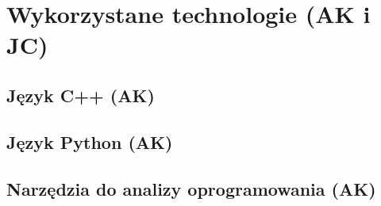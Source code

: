 \chapter{Wykorzystane technologie (AK i JC)}
\label{ch:technologies}

\graphicspath{{2_technologies/static/}}



\section{Język C++ (AK)}


\section{Język Python (AK)}

\section{Narzędzia do analizy oprogramowania (AK)}

